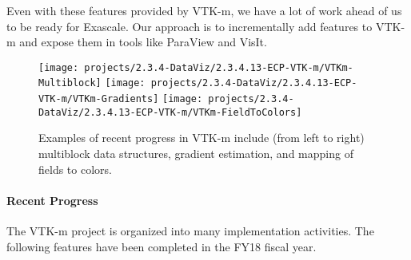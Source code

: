 Even with these features provided by VTK-m, we have a lot of work ahead of us to be ready for Exascale.
Our approach is to incrementally add features to VTK-m and expose them in tools like ParaView and VisIt.


\begin{figure}[t]
  \centering
  \texttt{[image: projects/2.3.4-DataViz/2.3.4.13-ECP-VTK-m/VTKm-Multiblock]}\quad
  \texttt{[image: projects/2.3.4-DataViz/2.3.4.13-ECP-VTK-m/VTKm-Gradients]}\quad
  \texttt{[image: projects/2.3.4-DataViz/2.3.4.13-ECP-VTK-m/VTKm-FieldToColors]}
  \caption{
    Examples of recent progress in VTK-m include (from left to right) multiblock data structures, gradient estimation, and mapping of fields to colors.
  }
  \label{fig:VTKmRecent}
\end{figure}

\paragraph{Recent Progress}
The VTK-m project is organized into many implementation activities.
The following features have been completed in the FY18 fiscal year.

